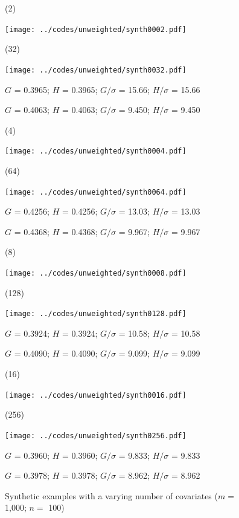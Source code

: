 \documentclass{article}
\newlength{\vertsep}
\newlength{\imsize}
\newlength{\imsized}
\begin{document}
\begin{figure}
\begin{centering}

(2) \parbox{\imsize}{\texttt{[image: ../codes/unweighted/synth0002.pdf]}}
\quad\quad
(32) \parbox{\imsize}{\texttt{[image: ../codes/unweighted/synth0032.pdf]}}

\parbox{\imsized}{\hfil \footnotesize $G$ = 0.3965; $H$ = 0.3965;
$G/\sigma$ = 15.66; $H/\sigma$ = 15.66}
\parbox{\imsized}{\hfil \footnotesize $G$ = 0.4063; $H$ = 0.4063;
$G/\sigma$ = 9.450; $H/\sigma$ = 9.450}

\vspace{\vertsep}

(4) \parbox{\imsize}{\texttt{[image: ../codes/unweighted/synth0004.pdf]}}
\quad\quad
(64) \parbox{\imsize}{\texttt{[image: ../codes/unweighted/synth0064.pdf]}}

\parbox{\imsized}{\hfil \footnotesize $G$ = 0.4256; $H$ = 0.4256;
$G/\sigma$ = 13.03; $H/\sigma$ = 13.03}
\parbox{\imsized}{\hfil \footnotesize $G$ = 0.4368; $H$ = 0.4368;
$G/\sigma$ = 9.967; $H/\sigma$ = 9.967}

\vspace{\vertsep}

(8) \parbox{\imsize}{\texttt{[image: ../codes/unweighted/synth0008.pdf]}}
\quad\quad
(128) \parbox{\imsize}{\texttt{[image: ../codes/unweighted/synth0128.pdf]}}

\parbox{\imsized}{\hfil \footnotesize $G$ = 0.3924; $H$ = 0.3924;
$G/\sigma$ = 10.58; $H/\sigma$ = 10.58}
\parbox{\imsized}{\hfil \footnotesize $G$ = 0.4090; $H$ = 0.4090;
$G/\sigma$ = 9.099; $H/\sigma$ = 9.099}

\vspace{\vertsep}

(16) \parbox{\imsize}{\texttt{[image: ../codes/unweighted/synth0016.pdf]}}
\quad\quad
(256) \parbox{\imsize}{\texttt{[image: ../codes/unweighted/synth0256.pdf]}}

\parbox{\imsized}{\hfil \footnotesize $G$ = 0.3960; $H$ = 0.3960;
$G/\sigma$ = 9.833; $H/\sigma$ = 9.833}
\parbox{\imsized}{\hfil \footnotesize $G$ = 0.3978; $H$ = 0.3978;
$G/\sigma$ = 8.962; $H/\sigma$ = 8.962}

\end{centering}
\caption{Synthetic examples with a varying number of covariates
($m =$ 1,000; $n =$ 100)}
\label{synth}
\end{figure}
\end{document}
